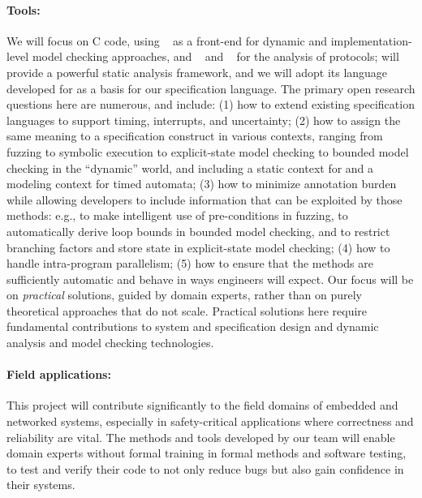 \paragraph{Tools:} We will focus on C code, using \deepstate~\cite{DeepState}
as a front-end for dynamic and implementation-level model checking approaches, and
\uppaal~\cite{uppaal} and
\prism~\cite{KNP2011:CAV} for the analysis of protocols; \framac will
provide a powerful static analysis framework, and we will adopt its
\acsl language developed for \framac as a basis for our specification language.  The primary open research questions here are numerous, and include:
(1) how to extend existing specification languages to support timing, interrupts,
and uncertainty;
(2) how to assign the same meaning to a specification construct in
  various contexts, ranging from fuzzing to symbolic execution to
  explicit-state model checking to bounded model checking in the
  ``dynamic'' \deepstate world, and including a static context for
  \framac and a modeling context for timed automata;
(3) how to minimize annotation burden while allowing developers to
include information that can be exploited by those methods: e.g., to
make intelligent use of pre-conditions in fuzzing, to automatically
derive loop bounds in bounded model checking, and to restrict
branching factors and store state in explicit-state model checking;
(4) how to handle intra-program parallelism;
(5) how to ensure that the methods are sufficiently automatic
  and behave in ways engineers will expect.
Our focus will be on \emph{practical} solutions, guided by domain experts, rather than on purely theoretical approaches
that do not scale. Practical solutions here require
fundamental contributions to system and specification design and
dynamic analysis and model checking technologies.

\paragraph{Field applications:}
This project will contribute significantly to the field domains of embedded and networked systems, especially in safety-critical applications where correctness and reliability are vital.
The methods and tools developed by our team will enable domain experts without formal training in formal methods and software testing, to test and verify their code to not only reduce bugs but also gain confidence in their systems.


